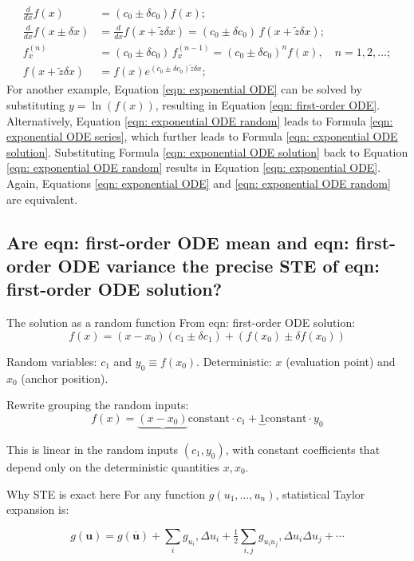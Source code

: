 \documentclass[twoside]{article}
\numberwithin{equation}{section}
\begin{document}
\begin{align}
\label{eqn: exponential ODE}
\frac{d}{d x} f(x) &= (c_0 \pm \delta c_0) f(x); \\
\label{eqn: exponential ODE random}
\frac{d}{d x} f(x \pm \delta x) &= \frac{d}{d x} f(x + \tilde{z} \delta x) = (c_0 \pm \delta c_0)\,  f(x + \tilde{z} \delta x); \\
\label{eqn: exponential ODE series}
f^{(n)}_x &= (c_0 \pm \delta c_0)\, f^{(n - 1)}_x = (c_0 \pm \delta c_0)^n f(x), \quad n = 1,2, \dots; \\
\label{eqn: exponential ODE solution}
f(x + \tilde{z} \delta x) &= f(x) e^{(c_0 \pm \delta c_0) \tilde{z} \delta x};
\end{align}
For another example, Equation \eqref{eqn: exponential ODE} can be solved by substituting $y = \ln(f(x))$, resulting in Equation \eqref{eqn: first-order ODE}.
Alternatively, Equation \eqref{eqn: exponential ODE random} leads to Formula \eqref{eqn: exponential ODE series}, which further leads to Formula \eqref{eqn: exponential ODE solution}.
Substituting Formula \eqref{eqn: exponential ODE solution} back to Equation \eqref{eqn: exponential ODE random} results in Equation \eqref{eqn: exponential ODE}.
Again, Equations \eqref{eqn: exponential ODE} and \eqref{eqn: exponential ODE random} are equivalent.


\subsection{Are {eqn: first-order ODE mean} and {eqn: first-order ODE variance} the precise STE of {eqn: first-order ODE solution}?}

The solution as a random function
From eqn: first-order ODE solution:
$$f(x) = (x - x_0)(c_1 \pm \delta c_1) + (f(x_0) \pm \delta f(x_0))$$

Random variables: $c_1$ and $y_0 \equiv f(x_0)$.
Deterministic: $x$ (evaluation point) and $x_0$ (anchor position).

Rewrite grouping the random inputs:
$$f(x) = \underbrace{(x - x_0)}{\text{constant}} \cdot c_1 + \underbrace{1}{\text{constant}} \cdot y_0$$

This is linear in the random inputs $(c_1, y_0)$, with constant coefficients that depend only on the deterministic quantities $x, x_0$.

Why STE is exact here
For any function $g(u_1, \ldots, u_n)$, statistical Taylor expansion is:

$$g(\mathbf{u}) = g(\overline{\mathbf{u}}) + \sum_i g_{u_i}, \Delta u_i + \tfrac{1}{2}\sum_{i,j} g_{u_i u_j}, \Delta u_i \Delta u_j + \cdots$$
\end{document}
